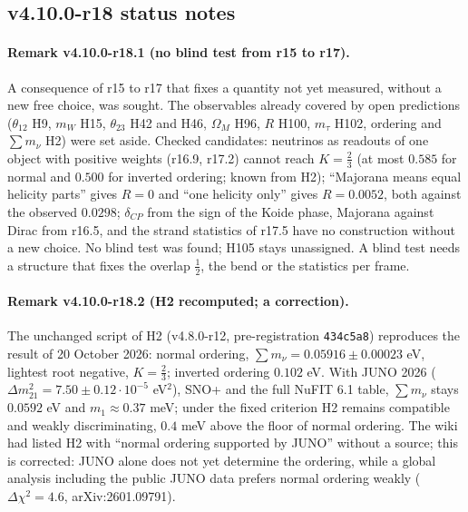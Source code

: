 \subsection*{v4.10.0-r18 status notes}
\label{subsec:v4100-r18-status}

\paragraph{Remark v4.10.0-r18.1 (no blind test from r15 to r17).}
A consequence of r15 to r17 that fixes a quantity not yet measured, without a new free choice, was sought.  The observables already
covered by open predictions (\(\theta_{12}\) H9, \(m_W\) H15, \(\theta_{23}\) H42 and H46, \(\Omega_M\) H96, \(R\) H100, \(m_\tau\) H102, ordering and
\(\sum m_\nu\) H2) were set aside.  Checked candidates: neutrinos as readouts of one object with positive weights (r16.9, r17.2) cannot
reach \(K=\tfrac23\) (at most \(0.585\) for normal and \(0.500\) for inverted ordering; known from H2); ``Majorana means equal helicity parts''
gives \(R=0\) and ``one helicity only'' gives \(R=0.0052\), both against the observed \(0.0298\); \(\delta_{CP}\) from the sign of the Koide phase,
Majorana against Dirac from r16.5, and the strand statistics of r17.5 have no construction without a new choice.  No blind test was
found; H105 stays unassigned.  A blind test needs a structure that fixes the overlap \(\tfrac12\), the bend or the statistics per frame.

\paragraph{Remark v4.10.0-r18.2 (H2 recomputed; a correction).}
The unchanged script of H2 (v4.8.0-r12, pre-registration \texttt{434c5a8}) reproduces the result of 20 October 2026: normal ordering,
\(\sum m_\nu=0.05916\pm0.00023\) eV, lightest root negative, \(K=\tfrac23\); inverted ordering \(0.102\) eV.  With JUNO 2026
(\(\Delta m^2_{21}=7.50\pm0.12\cdot10^{-5}\) eV\(^2\)), SNO+ and the full NuFIT 6.1 table, \(\sum m_\nu\) stays \(0.0592\) eV and \(m_1\approx0.37\) meV; under the
fixed criterion H2 remains compatible and weakly discriminating, \(0.4\) meV above the floor of normal ordering.  The wiki had listed H2
with ``normal ordering supported by JUNO'' without a source; this is corrected: JUNO alone does not yet determine the ordering, while
a global analysis including the public JUNO data prefers normal ordering weakly (\(\Delta\chi^2=4.6\), arXiv:2601.09791).

